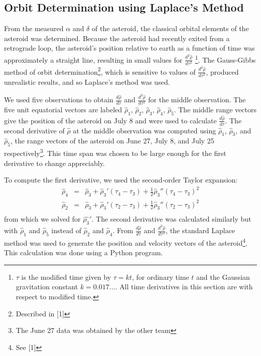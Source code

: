 \documentclass[12pt,journal,compsoc]{IEEEtran}
\begin{document}
\subsection{Orbit Determination using Laplace's Method}
From the measured $\alpha$ and $\delta$ of the asteroid, the classical orbital elements of the asteroid was determined. 
Because the asteroid had recently exited from a retrograde loop,
the asteroid's position relative to earth as a function of time was approximately a straight line,
resulting in small values for $\frac{d^2\hat{\rho}}{d\tau^2}$
\footnote{$\tau$ is the modified time given by $\tau=kt$, for ordinary time $t$ and the Gaussian gravitation constant $k=0.017...$.
All time derivatives in this section are with respect to modified time.}.
The Gauss-Gibbs method of orbit determination\footnote{Described in [1]}, which is
sensitive to values of $\frac{d^2\hat{\rho}}{d\tau^2}$, produced unrealistic results, and so Laplace's method was used.

We used five observations to obtain $\frac{d\hat{\rho}}{d\tau}$ and $\frac{d^2\hat{\rho}}{d\tau^2}$ for the middle observation.
The five unit equatorial vectors are labeled $\hat{\rho}_1$, $\hat{\rho}_2$, $\hat{\rho}_3$, $\hat{\rho}_4$, $\hat{\rho}_5$. The middle range vectors give the position of the asteroid on July 8 and were used to calculate $\frac{d\hat{\rho}}{d\tau}$.
The second derivative of $\hat{\rho}$ at the middle observation was computed using $\hat{\rho}_1$, $\hat{\rho}_3$, and $\hat{\rho}_5$, 
the range vectors of the asteroid on June 27, July 8, and July 25 respectively\footnote{The June 27 data was obtained by the other team}.
This time span was chosen to be large enough for the first derivative to change appreciably.


To compute the first derivative, we used the second-order Taylor expansion:
\begin{eqnarray*}
\hat{\rho}_4&=&\hat{\rho}_3+\hat{\rho}_3' (\tau_4-\tau_3)+\frac{1}{2}\hat{\rho}_3'' (\tau_4-\tau_3)^2\\
\hat{\rho}_2&=&\hat{\rho}_3+\hat{\rho}_3' (\tau_2-\tau_3)+\frac{1}{2}\hat{\rho}_3'' (\tau_2-\tau_3) ^2\\
\end{eqnarray*}
from which we solved for $\hat{\rho_3}'$.
The second derivative was calculated similarly but with $\hat{\rho}_1$ and $\hat{\rho}_5$ instead of $\hat{\rho}_2$ and $\hat{\rho}_4$.
From $\frac{d\hat{\rho}}{d\tau}$ and $\frac{d^2\hat{\rho}}{d\tau^2}$, the standard Laplace method was used to generate the position and velocity vectors of the asteroid\footnote{See [1]}.
This calculation was done using a Python program.
\end{document}
